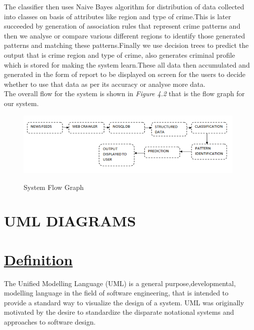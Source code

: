 \documentclass[12pt]{extreport}
\begin{document}
	The classifier then uses Naive Bayes algorithm for distribution of data collected into classes on basis of attributes like region and type of crime.This is later succeeded by generation of association rules that represent crime patterns and then we analyse or compare various different regions to identify those generated patterns and matching these patterns.Finally we use decision trees to predict the output that is crime region and type of crime, also generates criminal profile which is stored for making the system learn.These all data then accumulated and generated in the form of report to be displayed on screen for the users to decide whether to use that data as per its accuracy or analyse more data.\\
	
The overall flow for the system is shown in \textit{Figure 4.2} that is the  flow  graph for our system.
	\begin{figure}[H]

  \centering
	\includegraphics[scale=0.6]{SYSFLOW.png}\\
	\caption{System Flow Graph}
	
	\end{figure}
\section{UML DIAGRAMS}

\section*{\underline{Definition}}
\hspace*{5em}The Unified Modelling Language (UML) is a general purpose,developmental, modelling language in the field of software
engineering, that is intended to provide a standard way to visualize the design of a system. UML was originally motivated by the desire to standardize the disparate notational systems and approaches to software design.
\end{document}
